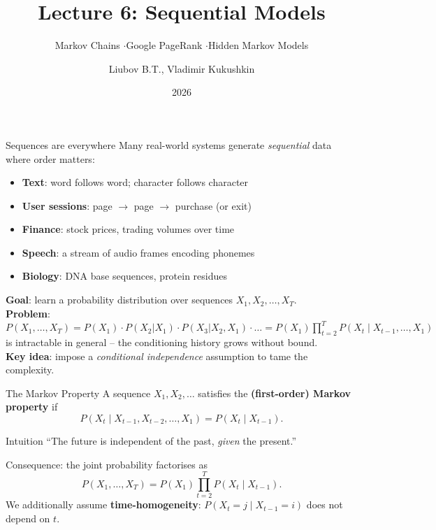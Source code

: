 \documentclass[aspectratio=169,t]{beamer}
\title{Lecture 6: Sequential Models}
\subtitle{Markov Chains \enspace$\cdot$\enspace Google PageRank \enspace$\cdot$\enspace Hidden Markov Models}
\author{Liubov B.T., Vladimir Kukushkin}
\institute{Constructor University}
\date{2026}
\begin{document}
\maketitle

\begin{frame}{Sequences are everywhere}
  Many real-world systems generate \emph{sequential} data where order matters:
  \begin{itemize}
    \item \textbf{Text}: word follows word; character follows character
    \item \textbf{User sessions}: page $\to$ page $\to$ purchase (or exit)
    \item \textbf{Finance}: stock prices, trading volumes over time
    \item \textbf{Speech}: a stream of audio frames encoding phonemes
    \item \textbf{Biology}: DNA base sequences, protein residues
  \end{itemize}
  \vspace{0.3cm}
  \textbf{Goal}: learn a probability distribution over sequences $X_1, X_2, \ldots, X_T$.\\[0.2cm]
  \textbf{Problem}: $P(X_1,\ldots,X_T) = P(X_1)\cdot P(X_2 | X_1)\cdot P(X_3 | X_2, X_1)\cdot\ldots = P(X_1)\prod_{t=2}^T P(X_t\mid X_{t-1},\ldots,X_1)$ is intractable in general -- the conditioning history grows without bound.\\[0.2cm]
  \textbf{Key idea}: impose a \emph{conditional independence} assumption to tame the complexity.
\end{frame}


\begin{frame}{The Markov Property}
  A sequence $X_1, X_2, \ldots$ satisfies the \textbf{(first-order) Markov property} if
  $$\boxed{P(X_t \mid X_{t-1}, X_{t-2}, \ldots, X_1) = P(X_t \mid X_{t-1}).}$$

  \begin{block}{Intuition}
    ``The future is independent of the past, \emph{given} the present.''
  \end{block}
  \vspace{0.2cm}
  Consequence: the joint probability factorises as
  $$P(X_1, \ldots, X_T) = P(X_1)\prod_{t=2}^{T} P(X_t \mid X_{t-1}).$$
  \vspace{0.1cm}
  We additionally assume \textbf{time-homogeneity}: $P(X_t=j \mid X_{t-1}=i)$ does not depend on $t$.
\end{frame}
\end{document}
